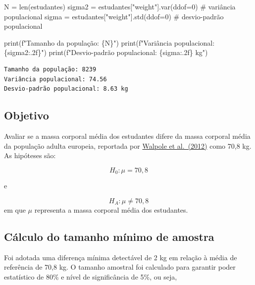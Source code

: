\documentclass[
  letterpaper,
  DIV=11,
  numbers=noendperiod]{scrreprt}
\newenvironment{Shaded}{\begin{snugshade}}{\end{snugshade}}
\newcommand{\BuiltInTok}[1]{\textcolor[rgb]{0.00,0.23,0.31}{#1}}
\newcommand{\CommentTok}[1]{\textcolor[rgb]{0.37,0.37,0.37}{#1}}
\newcommand{\DecValTok}[1]{\textcolor[rgb]{0.68,0.00,0.00}{#1}}
\newcommand{\NormalTok}[1]{\textcolor[rgb]{0.00,0.23,0.31}{#1}}
\newcommand{\OperatorTok}[1]{\textcolor[rgb]{0.37,0.37,0.37}{#1}}
\newcommand{\SpecialCharTok}[1]{\textcolor[rgb]{0.37,0.37,0.37}{#1}}
\newcommand{\SpecialStringTok}[1]{\textcolor[rgb]{0.13,0.47,0.30}{#1}}
\newcommand{\StringTok}[1]{\textcolor[rgb]{0.13,0.47,0.30}{#1}}
\begin{document}
\begin{Shaded}
\begin{Highlighting}[]
\NormalTok{N }\OperatorTok{=} \BuiltInTok{len}\NormalTok{(estudantes)}
\NormalTok{sigma2 }\OperatorTok{=}\NormalTok{ estudantes[}\StringTok{"weight"}\NormalTok{].var(ddof}\OperatorTok{=}\DecValTok{0}\NormalTok{) }\CommentTok{\# variância populacional }
\NormalTok{sigma }\OperatorTok{=}\NormalTok{ estudantes[}\StringTok{"weight"}\NormalTok{].std(ddof}\OperatorTok{=}\DecValTok{0}\NormalTok{) }\CommentTok{\# desvio{-}padrão populacional }

\BuiltInTok{print}\NormalTok{(}\SpecialStringTok{f"Tamanho da população: }\SpecialCharTok{\{}\NormalTok{N}\SpecialCharTok{\}}\SpecialStringTok{"}\NormalTok{) }
\BuiltInTok{print}\NormalTok{(}\SpecialStringTok{f"Variância populacional: }\SpecialCharTok{\{}\NormalTok{sigma2}\SpecialCharTok{:.2f\}}\SpecialStringTok{"}\NormalTok{) }
\BuiltInTok{print}\NormalTok{(}\SpecialStringTok{f"Desvio{-}padrão populacional: }\SpecialCharTok{\{}\NormalTok{sigma}\SpecialCharTok{:.2f\}}\SpecialStringTok{ kg"}\NormalTok{)}
\end{Highlighting}
\end{Shaded}

\begin{verbatim}
Tamanho da população: 8239
Variância populacional: 74.56
Desvio-padrão populacional: 8.63 kg
\end{verbatim}

\subsection{Objetivo}\label{objetivo-1}

Avaliar se a massa corporal média dos estudantes difere da massa
corporal média da população adulta europeia, reportada por
\href{https://link.springer.com/article/10.1186/1471-2458-12-439}{Walpole
et al.~(2012)} como 70,8 kg. As hipóteses são:

\[H_0: \mu = 70,8\]

e

\[H_A: \mu \neq 70,8\] em que \(\mu\) representa a massa corporal média
dos estudantes.

\subsection{Cálculo do tamanho mínimo de
amostra}\label{cuxe1lculo-do-tamanho-muxednimo-de-amostra}

Foi adotada uma diferença mínima detectável de 2 kg em relação à média
de referência de 70,8 kg. O tamanho amostral foi calculado para garantir
poder estatístico de 80\% e nível de significância de 5\%, ou seja,
\end{document}

